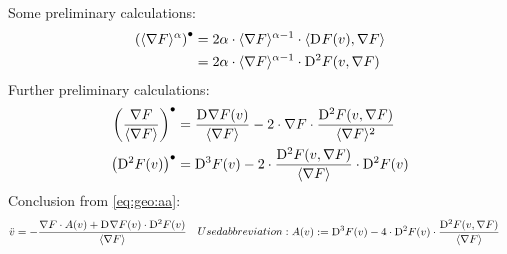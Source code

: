 Some preliminary calculations:
\begin{subequations}    
    \begin{align}
        \left( \langle  \nabla F  \rangle^\alpha \right)^\bullet
        &=
        2 \alpha \cdot \langle  \nabla F  \rangle^{\alpha-1} \cdot
        \langle  \mathrm{D}^{  }F( v ) ,  \nabla F  \rangle   \\
        &=
        2 \alpha \cdot \langle  \nabla F  \rangle^{\alpha-1} \cdot
        \mathrm{D}^{ 2 }F( v, \nabla F )
    \end{align}
\end{subequations}
Further preliminary calculations:
\begin{align}
\left( \frac{ \nabla F  }{ \langle  \nabla F   \rangle } \right)^\bullet
&=   \frac{ \mathrm{D}^{  } \nabla F  ( v ) }{ \langle  \nabla F   \rangle }
            -  2 \cdot \nabla F  \cdot \frac{ \mathrm{D}^{  2  } F ( v, \nabla F  ) }{ \langle  \nabla F   \rangle^2 }\\
\left( \mathrm{D}^{  2  } F ( v ) \right)^\bullet  &=
\mathrm{D}^{  3  } F ( v )  -  2 \cdot \frac{ \mathrm{D}^{  2  } F ( v, \nabla F  ) }{ \langle  \nabla F   \rangle } \cdot \mathrm{D}^{ 2 }F( v )
\end{align}
Conclusion from \eqref{eq:geo:aa}:
\begin{subequations}
\begin{align}
\ddot{ v }   &=
- \frac{ \grad F \mult A( v )  +
\diff{}{ \grad{ F } }( v ) \mult \diff{ 2 }{ F }( v ) }{ \skaq{ \grad{ F } } }
\end{align}
Used abbreviation:
\begin{align}
    A( v )  &:=
    \diff{ 3 }{ F }( v ) -
    4 \mult \diff{ 2 }{ F }( v ) \mult
    \frac{ \diff{ 2 }{ F }( v, \grad{ F } ) }{ \skaq{ \grad{ F } } }
\end{align}
\end{subequations}